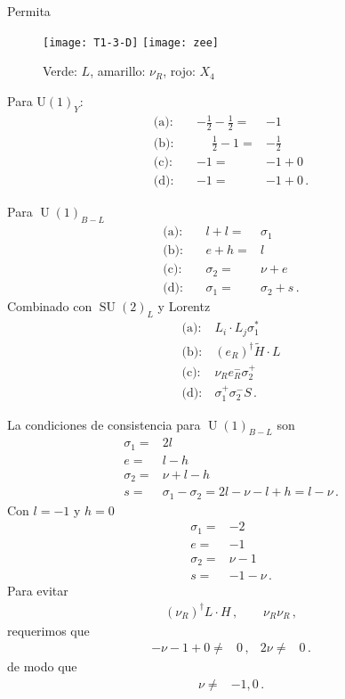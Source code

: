 \begin{frame}
Permita


\begin{figure}
  \centering
  \texttt{[image: T1-3-D]} \hspace{1cm}
  \texttt{[image: zee]}
  \caption{Verde: $L$, amarillo: $\nu_R$, rojo: $X_4$  }
  \label{fig:gg}
\end{figure}
\end{frame}

\begin{frame}
Para $\operatorname{U(1)}_Y$:
\begin{align}
   \text{(a)}:&\  &-\frac{1}{2}-\frac{1}{2}=&-1 \nonumber\\
   \text{(b)}:&\ &\phantom{-} \frac{1}{2}-1=&-\frac{1}{2} \nonumber\\
  \text{(c)}:&\ &-1=&-1+0  \nonumber\\
  \text{(d)}:&\  & -1=&-1+0  \,.
\end{align}

Para $\operatorname{U}(1)_{B-L}$
\begin{align}
  \text{(a)}:&\  &l +l=&\sigma_1 \nonumber\\
  \text{(b)}:&\  &e+h=&l \nonumber\\
  \text{(c)}:&\  &\sigma_2=&\nu+e \nonumber\\
  \text{(d)}:&\ &\sigma_1=&\sigma_2+s\,.
\end{align}
Combinado con $\operatorname{SU}(2)_L$ y Lorentz
\begin{align}
  \text{(a)}:&\  L_i\cdot L_j \sigma_1^{*} \nonumber\\
  \text{(b)}:&\  \left( e_R \right)^{\dagger} \widetilde{H} \cdot L \nonumber\\
  \text{(c)}:&\  \nu_R e_R^- \sigma_2^+  \nonumber\\
  \text{(d)}:&\ \sigma_1^+\sigma_2^{-} S\,.
\end{align}

La condiciones de consistencia para $\operatorname{U}(1)_{B-L}$ son 
\begin{align}
    \sigma_1=&2l \nonumber\\
  e=&l-h \nonumber\\
  \sigma_2=&\nu+l-h \nonumber\\
  s=&\sigma_1-\sigma_2=2l-\nu-l+h=l-\nu\,.
\end{align}
Con $l=-1$ y $h=0$
\begin{align}
   \sigma_1=&-2 \nonumber\\
    e=&-1 \nonumber\\
\sigma_2=&\nu-1 \nonumber\\
   s=&-1-\nu\,.
\end{align}
Para evitar
\begin{align}
 \left( \nu_R \right)^{\dagger}  L\cdot H\,,\qquad \nu_R \nu_R\,,
\end{align}
requerimos que
\begin{align}
  -\nu -1 +0 \ne& 0\,, & 2 \nu\ne& 0\,.
\end{align}
de modo que
\begin{align}
  \nu\ne& -1,0\,.
\end{align}


\end{frame}
